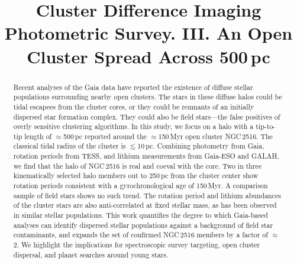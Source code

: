 \documentclass[12pt,twocolumn,tighten]{aastex63}
\begin{document}

\title{
  Cluster Difference Imaging Photometric Survey. III.
  An Open Cluster Spread Across 500\,pc
}



\begin{abstract}
  Recent analyses of the Gaia data have reported the existence of
  diffuse stellar populations surrounding nearby open clusters. 
  The stars in these diffuse halos could be tidal escapees from the
  cluster cores, or they could be remnants of an initially dispersed
  star formation complex.
  They could also be field stars---the false positives of overly
  sensitive clustering algorithms.
  In this study, we focus on a halo with a tip-to-tip length of
  $\approx$500\,pc reported around the $\approx$150\,Myr open cluster
  NGC\,2516.
  The classical tidal radius of the cluster is $\lesssim$10\,pc.
  Combining photometry from Gaia, rotation periods from TESS, and
  lithium measurements from Gaia-ESO and GALAH, we find that the halo
  of NGC\,2516 is real and coeval with the core.
  Two in three kinematically selected halo members out to 250\,pc from the
  cluster center show rotation periods consistent with a
  gyrochronological age of 150\,Myr.
  A comparison sample of field stars shows no such trend.
  The rotation period and lithium abundances of the cluster stars are
  also anti-correlated at fixed stellar mass, as has been observed in
  similar stellar populations.
  This work quantifies the degree to which Gaia-based
  analyses can identify dispersed stellar populations against a
  background of field star contaminants, and
  expands the set of confirmed NGC\,2516 members by a factor
  of $\approx$2.
  We highlight the implications for spectroscopic survey targeting,
  open cluster dispersal, and planet searches around young stars.
\end{abstract}

\end{document}
